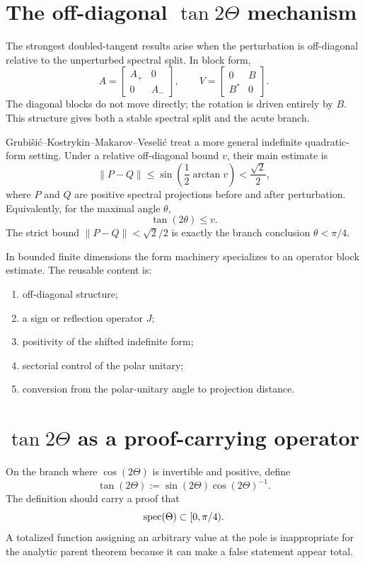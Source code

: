 \section{The off-diagonal $\tan 2\Theta$ mechanism}

The strongest doubled-tangent results arise when the perturbation is off-diagonal relative to the unperturbed spectral split. In block form,
\[
  A=\begin{bmatrix}A_+&0\\0&A_-\end{bmatrix},
  \qquad
  V=\begin{bmatrix}0&B\\B^*&0\end{bmatrix}.
\]
The diagonal blocks do not move directly; the rotation is driven entirely by $B$. This structure gives both a stable spectral split and the acute branch.

Grubi\v{s}i\'c--Kostrykin--Makarov--Veseli\'c treat a more general indefinite quadratic-form setting. Under a relative off-diagonal bound $v$, their main estimate is
\[
  \|P-Q\|
  \le
  \sin\left(\frac12\arctan v\right)
  <\frac{\sqrt2}{2},
\]
where $P$ and $Q$ are positive spectral projections before and after perturbation. Equivalently, for the maximal angle $\theta$,
\[
  \tan(2\theta)\le v.
\]
The strict bound $\|P-Q\|<\sqrt2/2$ is exactly the branch conclusion $\theta<\pi/4$.

In bounded finite dimensions the form machinery specializes to an operator block estimate. The reusable content is:
\begin{enumerate}
\item off-diagonal structure;
\item a sign or reflection operator $J$;
\item positivity of the shifted indefinite form;
\item sectorial control of the polar unitary;
\item conversion from the polar-unitary angle to projection distance.
\end{enumerate}

\section{$\tan 2\Theta$ as a proof-carrying operator}

On the branch where $\cos(2\Theta)$ is invertible and positive, define
\[
  \tan(2\Theta)
  :=\sin(2\Theta)\cos(2\Theta)^{-1}.
\]
The definition should carry a proof that
\[
  \operatorname{spec}(\Theta)\subset[0,\pi/4).
\]
A totalized function assigning an arbitrary value at the pole is inappropriate for the analytic parent theorem because it can make a false statement appear total.

